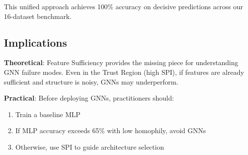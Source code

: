 This unified approach achieves 100\% accuracy on decisive predictions across our 16-dataset benchmark.

\subsection{Implications}

\textbf{Theoretical}: Feature Sufficiency provides the missing piece for understanding GNN failure modes. Even in the Trust Region (high SPI), if features are already sufficient and structure is noisy, GNNs may underperform.

\textbf{Practical}: Before deploying GNNs, practitioners should:
\begin{enumerate}
    \item Train a baseline MLP
    \item If MLP accuracy exceeds 65\% with low homophily, avoid GNNs
    \item Otherwise, use SPI to guide architecture selection
\end{enumerate}

